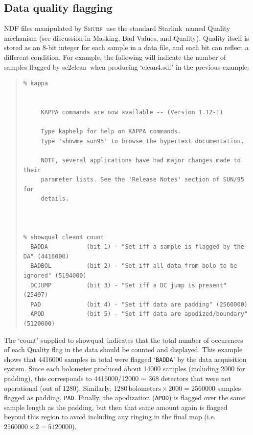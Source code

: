 \documentclass[twoside,11pt]{article}
\newcommand{\htmladdnormallink}[2]{#1}
\newcommand{\xref}[3]{#1}
\newcommand{\xlabel}[1]{}
\renewcommand{\_}{\texttt{\symbol{95}}}
\newenvironment{myquote}{\begin{quote}\begin{small}}{\end{small}\end{quote}}
\newcommand{\starlink}{\htmladdnormallink{Starlink}{http://starlink.jach.hawaii.edu}}
\newcommand{\smurf}{\xref{\textsc{Smurf}}{sun258}{}}
\newcommand{\task}[1]{\textsf{#1}}
\newcommand{\clean}{\xref{\task{sc2clean}}{sun258}{SC2CLEAN}}
\newcommand{\showqual}{\xref{\task{showqual}}{sun95}{SHOWQUAL}}
\begin{document}
\subsection{\xlabel{quality}Data quality flagging}

NDF files manipulated by \smurf\ use the standard \starlink\ named
Quality mechanism (see discussion in \xref{Masking, Bad Values, and
  Quality}{sun95}{se_masking}). Quality itself is stored as an 8-bit
integer for each sample in a data file, and each bit can reflect a
different condition. For example, the following will indicate the
number of samples flagged by \clean\ when producing `clean4.sdf' in
the previous example:

\begin{myquote}
\begin{verbatim}
% kappa


     KAPPA commands are now available -- (Version 1.12-1)

     Type kaphelp for help on KAPPA commands.
     Type 'showme sun95' to browse the hypertext documentation.

     NOTE, several applications have had major changes made to their
     parameter lists. See the 'Release Notes' section of SUN/95 for
     details.



% showqual clean4 count
  BADDA           (bit 1) - "Set iff a sample is flagged by the DA" (4416000)
  BADBOL          (bit 2) - "Set iff all data from bolo to be ignored" (5194000)
  DCJUMP          (bit 3) - "Set iff a DC jump is present" (25497)
  PAD             (bit 4) - "Set iff data are padding" (2560000)
  APOD            (bit 5) - "Set iff data are apodized/boundary" (5120000)
\end{verbatim}
\end{myquote}

The `count' supplied to \showqual\ indicates that the total number of
occurences of each Quality flag in the data should be counted and
displayed.  This example shows that 4416000 samples in total were
flagged `\texttt{BADDA}' by the data acquisition system. Since each
bolometer produced about 14000 samples (including 2000 for padding),
this corresponds to 4416000/12000 $\sim$ 368 detectors that were not
operational (out of 1280). Similarly, $1280 \,\mathrm{bolometers} \times 2000 =
2560000$ samples flagged as padding, \texttt{PAD}. Finally, the
apodization (\texttt{APOD}) is flagged over the same sample length as
the padding, but then that same amount again is flagged beyond this
region to avoid including any ringing in the final map (i.e. $2560000
\times 2 = 5120000$).
\end{document}
